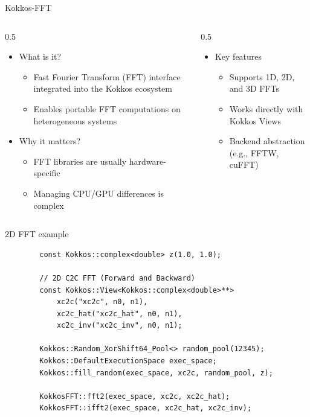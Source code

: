 \documentclass[
    aspectratio=169,
    \createHandout
]{beamer}
\begin{document}
\begin{frame}{Kokkos-FFT}
    \begin{columns}
        \begin{column}{0.5\linewidth}
            \begin{itemize}
                \item What is it?
                \begin{itemize}
                    \item Fast Fourier Transform (FFT) interface integrated into the Kokkos ecosystem
                    \item Enables portable FFT computations on heterogeneous systems
                \end{itemize}
                \item Why it matters?
                \begin{itemize}
                    \item FFT libraries are usually hardware-specific
                    \item Managing CPU/GPU differences is complex
                \end{itemize}
            \end{itemize}
        \end{column}
        \begin{column}{0.5\linewidth}
            \begin{itemize}
                \item Key features
                \begin{itemize}
                    \item Supports 1D, 2D, and 3D FFTs
                    \item Works directly with Kokkos Views
                    \item Backend abstraction (e.g., FFTW, cuFFT)
                \end{itemize}
            \end{itemize}
        \end{column}
    \end{columns}
\end{frame}

\begin{frame}[fragile]{2D FFT example}
    \begin{verbatim}
        const Kokkos::complex<double> z(1.0, 1.0);

        // 2D C2C FFT (Forward and Backward)
        const Kokkos::View<Kokkos::complex<double>**>
            xc2c("xc2c", n0, n1),
            xc2c_hat("xc2c_hat", n0, n1),
            xc2c_inv("xc2c_inv", n0, n1);

        Kokkos::Random_XorShift64_Pool<> random_pool(12345);
        Kokkos::DefaultExecutionSpace exec_space;
        Kokkos::fill_random(exec_space, xc2c, random_pool, z);

        KokkosFFT::fft2(exec_space, xc2c, xc2c_hat);
        KokkosFFT::ifft2(exec_space, xc2c_hat, xc2c_inv);
    \end{verbatim}
\end{frame}
\end{document}
